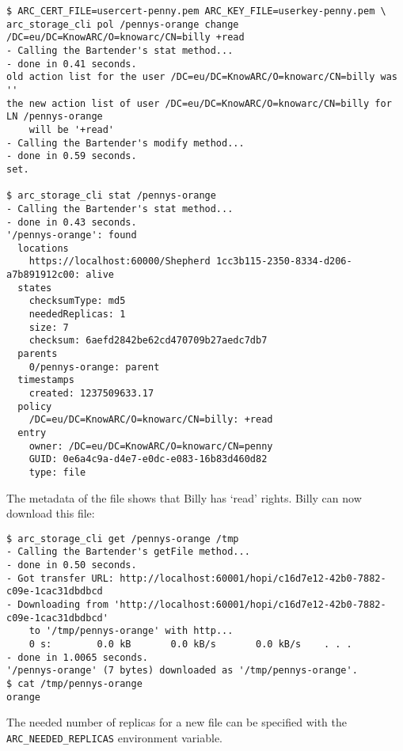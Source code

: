 \documentclass{article}
\begin{document}
\begin{verbatim}
$ ARC_CERT_FILE=usercert-penny.pem ARC_KEY_FILE=userkey-penny.pem \
arc_storage_cli pol /pennys-orange change /DC=eu/DC=KnowARC/O=knowarc/CN=billy +read
- Calling the Bartender's stat method...
- done in 0.41 seconds.
old action list for the user /DC=eu/DC=KnowARC/O=knowarc/CN=billy was ''
the new action list of user /DC=eu/DC=KnowARC/O=knowarc/CN=billy for LN /pennys-orange
    will be '+read'
- Calling the Bartender's modify method...
- done in 0.59 seconds.
set.

$ arc_storage_cli stat /pennys-orange
- Calling the Bartender's stat method...
- done in 0.43 seconds.
'/pennys-orange': found
  locations
    https://localhost:60000/Shepherd 1cc3b115-2350-8334-d206-a7b891912c00: alive
  states
    checksumType: md5
    neededReplicas: 1
    size: 7
    checksum: 6aefd2842be62cd470709b27aedc7db7
  parents
    0/pennys-orange: parent
  timestamps
    created: 1237509633.17
  policy
    /DC=eu/DC=KnowARC/O=knowarc/CN=billy: +read
  entry
    owner: /DC=eu/DC=KnowARC/O=knowarc/CN=penny
    GUID: 0e6a4c9a-d4e7-e0dc-e083-16b83d460d82
    type: file
\end{verbatim}

The metadata of the file shows that Billy has `read' rights. Billy can now download this file:

\begin{verbatim}
$ arc_storage_cli get /pennys-orange /tmp
- Calling the Bartender's getFile method...
- done in 0.50 seconds.
- Got transfer URL: http://localhost:60001/hopi/c16d7e12-42b0-7882-c09e-1cac31dbdbcd
- Downloading from 'http://localhost:60001/hopi/c16d7e12-42b0-7882-c09e-1cac31dbdbcd'
    to '/tmp/pennys-orange' with http...
    0 s:        0.0 kB       0.0 kB/s       0.0 kB/s    . . .       
- done in 1.0065 seconds.
'/pennys-orange' (7 bytes) downloaded as '/tmp/pennys-orange'.
$ cat /tmp/pennys-orange 
orange
\end{verbatim}

The needed number of replicas for a new file can be specified with the \verb!ARC_NEEDED_REPLICAS! environment variable.
\end{document}
